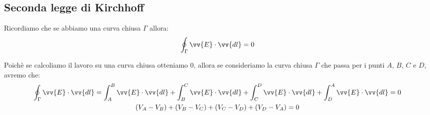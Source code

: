 \documentclass[a4paper, oneside]{article}
\begin{document}
\subsection{Seconda legge di Kirchhoff}
Ricordiamo che se abbiamo una curva chiusa $\Gamma$ allora:
\begin{gather*}
    \oint_\Gamma \vv{E} \cdot \vv{dl} = 0
\end{gather*}
\begin{center}
\end{center}
Poichè se calcoliamo il lavoro su una curva chiusa otteniamo 0, allora se consideriamo la curva chiusa $\Gamma$ che passa per i punti $A$, $B$, $C$ e $D$, avremo che:
\begin{gather*}
    \oint_\Gamma \vv{E} \cdot \vv{dl} = \int_{A}^{B} \vv{E} \cdot \vv{dl} + \int_{B}^{C} \vv{E} \cdot \vv{dl} + \int_{C}^{D} \vv{E} \cdot \vv{dl} + \int_{D}^{A} \vv{E} \cdot \vv{dl} = 0\\
    (V_A - V_B) + (V_B - V_C) + (V_C - V_D) + (V_D - V_A) = 0
\end{gather*}
\end{document}
